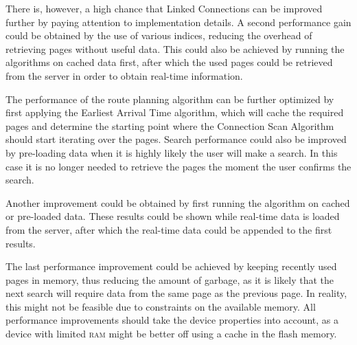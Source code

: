 \documentclass[twocolumn]{phdsymp} %
\begin{document}
There is, however, a high chance that Linked Connections can be improved further by paying attention to implementation details. A second performance gain could be obtained by the use of various indices, reducing the overhead of retrieving pages without useful data. This could also be achieved by running the algorithms on cached data first, after which the used pages could be retrieved from the server in order to obtain real-time information.

The performance of the route planning algorithm can be further optimized by first applying the Earliest Arrival Time algorithm, which will cache the required pages and
determine the starting point where the Connection Scan Algorithm should start iterating over the pages. Search performance could also be improved by pre-loading data when it is highly likely the user will make a search. In this case it is no longer needed to retrieve the pages the moment the user confirms the search.

Another improvement could be obtained by first running the algorithm on cached or pre-loaded data. These results could be shown while real-time data is loaded from the
server, after which the real-time data could be appended to the first results.

The last performance improvement could be achieved by keeping recently used pages in memory, thus reducing the amount of garbage, as it is likely that the next search will
require data from the same page as the previous page. In reality, this might not be feasible due to constraints on the available memory. All performance improvements should take the device properties into account, as a device with limited \textsc{ram} might be better off using a cache in the flash memory.

\nocite{*}

\end{document}

